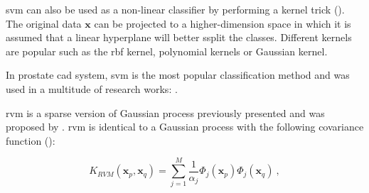 \begin{enumerate}[leftmargin=*]
%
%
%
%
%

\ac{svm} can also be used as a non-linear classifier by performing a kernel trick (\cite{Boser1992}). The original data $\mathbf{x}$ can be projected to a higher-dimension space in which it is assumed that a linear hyperplane will better ssplit the classes. Different kernels are popular such as the \ac{rbf} kernel, polynomial kernels or Gaussian kernel.

In prostate \ac{cad} system, \ac{svm} is the most popular classification method and was used in a multitude of research works: \cite{Artan2009,Artan2010,Chan2003,Kelm2007,Litjens2011,Litjens2012,Liu2013,Lopes2011,Niaf2011,Niaf2012,Ozer2009,Ozer2010,Parfait2012,Peng2013,Sung2011,Tiwari2012,Vos2008,Vos2008a,Vos2010,Vos2012}.

\Acf{rvm} is a sparse version of Gaussian process previously presented and was proposed by \cite{Tipping2001}. \ac{rvm} is identical to a Gaussian process with the following covariance function (\cite{Quinonero-Candela2002}):

\begin{equation}
	K_{RVM}(\mathbf{x}_p,\mathbf{x}_q) = \sum_{j=1}^{M} \frac{1}{\alpha_j} \Phi_j ( \mathbf{x}_p ) \Phi_j ( \mathbf{x}_q ) \ ,
 	\label{eq:rvm}
\end{equation}


\end{enumerate}

